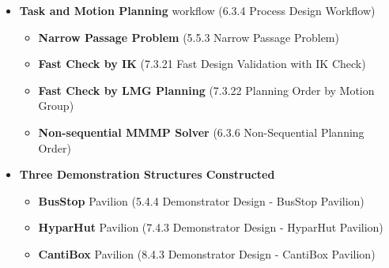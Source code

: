 \documentclass[11pt]{book}
\begin{document}
\vspace{1\baselineskip}
\begin{itemize}
	\item \textbf{Task and Motion Planning }workflow (6.3.4 Process Design Workflow)

\begin{itemize}
	\item \textbf{Narrow Passage Problem }(5.5.3 Narrow Passage Problem)

	\item \textbf{Fast Check by IK} (7.3.21 Fast Design Validation with IK Check)

	\item \textbf{Fast Check by LMG Planning} (7.3.22 Planning Order by Motion Group)

	\item \textbf{Non-sequential MMMP Solver} (6.3.6 Non-Sequential Planning Order)

\end{itemize}
	\item \textbf{Three Demonstration Structures Constructed}

\begin{itemize}
	\item \textbf{BusStop }Pavilion (5.4.4 Demonstrator Design - BusStop Pavilion)

	\item \textbf{HyparHut }Pavilion (7.4.3 Demonstrator Design  - HyparHut Pavilion)

	\item \textbf{CantiBox }Pavilion (8.4.3 Demonstrator Design  - CantiBox Pavilion)

\end{itemize}
\end{itemize}
\end{document}
